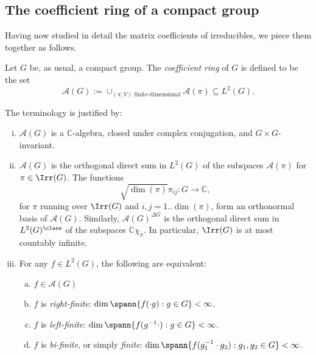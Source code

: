 \documentclass[reqno]{amsart} 
\begin{document}
\subsection{The coefficient ring of a compact group}\label{sec:cnh2vopkyp}
Having now studied in detail the matrix coefficients of irreducibles, we piece them together as follows.
\begin{definition}
  Let $G$ be, as usual, a compact group.  The \emph{coefficient ring} of $G$ is defined to be the set
  \begin{equation*}
    \mathcal{A}(G) := \cup _{(\pi,V) \text{ finite-dimensional}} \mathcal{A}(\pi) \subseteq L^2(G).
  \end{equation*}
\end{definition}
The terminology is justified by:
\begin{theorem}\label{thm:coeff-ring-characterizations}
  \begin{enumerate}
[(i)]
  \item $\mathcal{A}(G)$ is a $\mathbb{C}$-algebra, closed under complex conjugation, and $G \times G$-invariant.
  \item $\mathcal{A}(G)$ is the orthogonal direct sum in $L^2(G)$ of the subspaces $\mathcal{A}(\pi)$ for $\pi \in \Irr(G)$.  The functions
    \begin{equation}\label{eqn:ONB-via-matrix-coefs}
      \sqrt{\dim(\pi)} \pi_{i j} : G \rightarrow \mathbb{C},
    \end{equation}
    for $\pi$ running over $\Irr(G)$ and $i,j = 1..\dim(\pi)$, form an orthonormal basis of $\mathcal{A}(G)$.  Similarly, $\mathcal{A}(G)^{\Delta G}$ is the orthogonal direct sum in $L^2(G)^{\class}$ of the subspaces $\mathbb{C} \chi_\pi$.  In particular, $\Irr(G)$ is at most countably infinite.
  \item For any $f \in L^2(G)$, the following are equivalent:
    \begin{enumerate}
[(a)]
    \item $f \in \mathcal{A}(G)$
    \item $f$ is \emph{right-finite}: $\dim \spann \{f(\cdot g) : g \in G\} < \infty$.
    \item $f$ is \emph{left-finite}: $\dim \spann \{f(g^{-1} \cdot ) : g \in G\} < \infty$.
    \item $f$ is \emph{bi-finite}, or simply \emph{finite}: $\dim \spann \{f(g_1^{-1} \cdot g_2 ) : g_1, g_2 \in G\} < \infty$.
    \end{enumerate}
  \end{enumerate}
\end{theorem}
\end{document}
